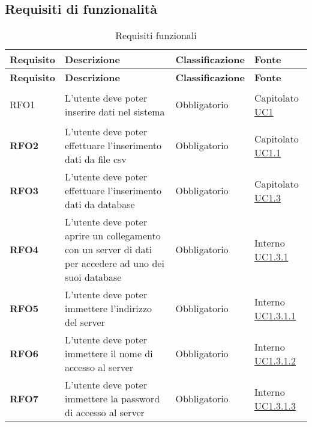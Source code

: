 \subsection{Requisiti di funzionalità}
\label{sub:requisiti_di_funzionalita}

\renewcommand{\arraystretch}{2} %
\begin{longtable}[H]{>{\centering\bfseries}m{2cm} >{\centering}m{9cm} >{\centering}m{2.5cm} >{\centering\arraybackslash}m{2.5cm}}
    \caption{Requisiti funzionali}%
    \label{tab:requisiti_funzionali} \\
    \rowcolor{lightgray}
    {\textbf{Requisito}} & {\textbf{Descrizione}} & {\textbf{Classificazione}} & {\textbf{Fonte}}  \\
    \endfirsthead%
    \rowcolor{lightgray}
    {\textbf{Requisito}} & {\textbf{Descrizione}} & {\textbf{Classificazione}} & {\textbf{Fonte}}  \\
    \endhead%
    \rowcolor{white}
    \multicolumn{4}{c}{\textit{Continua alla pagina successiva}}
    \endfoot%
    \endlastfoot%

    RFO1
    & L'utente deve poter inserire dati nel sistema 
    & Obbligatorio
    & Capitolato \hyperref[sub:uc1]{UC1} \\

    RFO2
    & L'utente deve poter effettuare l'inserimento dati da file csv
    & Obbligatorio
    & Capitolato  \hyperref[ssub:uc1.1]{UC1.1} \\

    RFO3
    & L'utente deve poter effettuare l'inserimento dati da database
    & Obbligatorio
    & Capitolato \hyperref[ssub:uc1.3]{UC1.3}\\

    RFO4
    &   L'utente deve poter aprire un collegamento con un server di dati per 
        accedere ad uno dei suoi database
    & Obbligatorio
    & Interno  \hyperref[par:uc1.3.1]{UC1.3.1}\\

    RFO5
    &   L'utente deve poter immettere l'indirizzo del server
    & Obbligatorio
    & Interno  \hyperref[spar:uc1.3.1.1]{UC1.3.1.1}\\

    RFO6
    &   L'utente deve poter immettere il nome di accesso al server
    & Obbligatorio
    & Interno  \hyperref[spar:uc1.3.1.2]{UC1.3.1.2}\\

    RFO7
    &   L'utente deve poter immettere la password di accesso al server
    & Obbligatorio
    & Interno  \hyperref[spar:uc1.3.1.3]{UC1.3.1.3}\\


\end{longtable}
